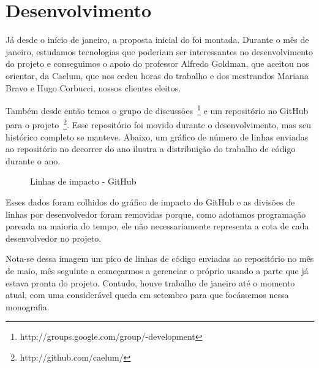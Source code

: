 \section{Desenvolvimento}

Já desde o início de janeiro, a proposta inicial do \calopsita foi montada. Durante o mês de janeiro, estudamos tecnologias que poderiam ser interessantes no desenvolvimento do projeto e conseguimos o apoio do professor Alfredo Goldman, que aceitou nos orientar, da Caelum, que nos cedeu horas do trabalho e dos mestrandos Mariana Bravo e Hugo Corbucci, nossos clientes eleitos.

Também desde então temos o grupo de discussões~\footnote{http://groups.google.com/group/\calopsita-development} e um repositório no GitHub para o projeto~\footnote{http://github.com/caelum/\calopsita}. Esse repositório foi movido durante o desenvolvimento, mas seu histórico completo se manteve. Abaixo, um gráfico de número de linhas enviadas ao repositório no decorrer do ano ilustra a distribuição do trabalho de código durante o ano.

\begin{figure}[H]
  \centering
  \caption{Linhas de impacto - GitHub}
\end{figure}

Esses dados foram colhidos do gráfico de impacto do GitHub e as divisões de linhas por desenvolvedor foram removidas porque, como adotamos programação pareada na maioria do tempo, ele não necessariamente representa a cota de cada desenvolvedor no projeto.

Nota-se dessa imagem um pico de linhas de código enviadas ao repositório no mês de maio, mês seguinte a começarmos a gerenciar o próprio \calopsita usando a parte que já estava pronta do projeto. Contudo, houve trabalho de janeiro até o momento atual, com uma considerável queda em setembro para que focássemos nessa monografia.

